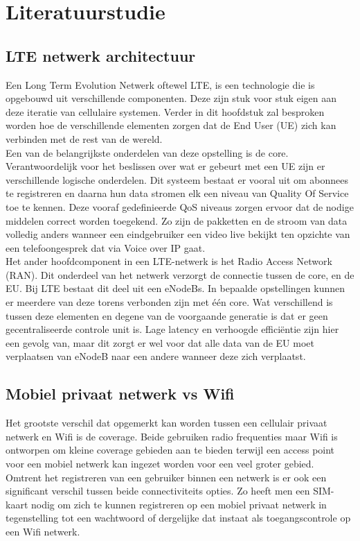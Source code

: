 
\section{Literatuurstudie}%
\label{sec:state-of-the-art}

\subsection{LTE netwerk architectuur}
Een Long Term Evolution Netwerk oftewel LTE, is een technologie die is opgebouwd uit verschillende componenten. Deze zijn stuk voor stuk eigen aan deze iteratie van cellulaire systemen. Verder in dit hoofdstuk zal besproken worden hoe de verschillende elementen zorgen dat de End User (UE) zich kan verbinden met de rest van de wereld.
\\
Een van de belangrijkste onderdelen van deze opstelling is de core. Verantwoordelijk voor het beslissen over wat er gebeurt met een UE zijn er verschillende logische onderdelen. Dit systeem bestaat er vooral uit om abonnees te registreren en daarna hun data stromen elk een niveau van Quality Of Service toe te kennen. Deze vooraf gedefinieerde QoS niveaus zorgen ervoor dat de nodige middelen correct worden toegekend. Zo zijn de pakketten en de stroom van data volledig anders wanneer een eindgebruiker een video live bekijkt ten opzichte van een telefoongesprek dat via Voice over IP gaat. \autocite{Palat2011} 
\\
Het ander hoofdcomponent in een LTE-netwerk is het Radio Access Network (RAN). Dit onderdeel van het netwerk verzorgt de connectie tussen de core, en de EU. Bij LTE bestaat dit deel uit een eNodeBs. In bepaalde opstellingen kunnen er meerdere van deze torens verbonden zijn met één core. Wat verschillend is tussen deze elementen en degene van de voorgaande generatie is dat er geen gecentraliseerde controle unit is. Lage latency en verhoogde efficiëntie zijn hier een gevolg van, maar dit zorgt er wel voor dat alle data van de EU moet verplaatsen van eNodeB naar een andere wanneer deze zich verplaatst. \autocite{Palat2011} 
\\
\subsection{Mobiel privaat netwerk vs Wifi}
Het grootste verschil dat opgemerkt kan worden tussen een cellulair privaat netwerk en Wifi is de coverage. Beide gebruiken radio frequenties maar Wifi is ontworpen om kleine coverage gebieden aan te bieden terwijl een access point voor een mobiel netwerk kan ingezet worden voor een veel groter gebied.\autocite{2024Digi} 
\\
Omtrent het registreren van een gebruiker binnen een netwerk is er ook een significant verschil tussen beide connectiviteits opties. Zo heeft men een SIM-kaart nodig om zich te kunnen registreren op een mobiel privaat netwerk in tegenstelling tot een wachtwoord of dergelijke dat instaat als toegangscontrole op een Wifi netwerk.\autocite{David2024}

